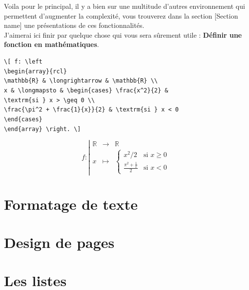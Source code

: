\documentclass[11pt]{article}				%
\begin{document}
Voila pour le principal, il y a bien sur une multitude d'autres environnement qui permettent d'augmenter la complexité, vous trouverez dans la section [Section name] une présentations de ces fonctionnalités. \\
J'aimerai ici finir par quelque chose qui vous sera sûrement utile : \textbf{Définir une fonction en mathématiques}.
\begin{multicols}{2}
	
\verb|\[ f: \left | \\
\verb|\begin{array}{rcl}| \\
\verb|\mathbb{R} & \longrightarrow & \mathbb{R} \\|	\\
\verb|x & \longmapsto & \begin{cases} \frac{x^2}{2} &| \\ \verb|\textrm{si } x > \geq 0 \\| \\
\verb|\frac{\pi^2 + \frac{1}{x}}{2} & \textrm{si } x < 0 | \\ 
\verb|\end{cases}| \\
\verb|\end{array} \right. \]|
	
\columnbreak	

\[
f: \left|
\begin{array}{rcl}
	\mathbb{R} & \longrightarrow & \mathbb{R} \\
	x & \longmapsto & \begin{cases} x^2/2 & \textrm{si } x \geq 0 \\
	\frac{\pi^2 + \frac{1}{x}}{2} & \textrm{si } x < 0 \end{cases}
\end{array} \right. \]
\end{multicols}

\clearpage



\section{Formatage de texte}

\section{Design de pages}

\section{Les listes}
\end{document}

